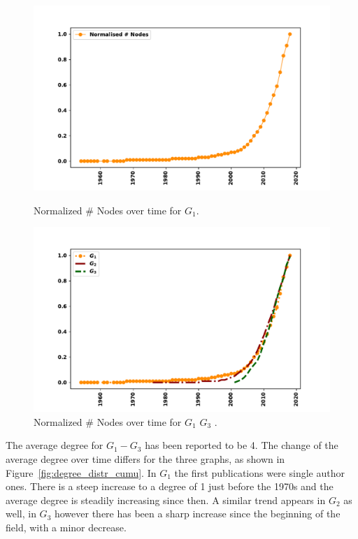 \documentclass{article}
\theoremstyle{definition}
\begin{document}
\begin{figure}[!hbtp]
    \begin{minipage}{.45\textwidth}
        \centering
        \includegraphics[width=\textwidth]{./assets/images/nodes_percentage_over_time.pdf}
        \caption{Normalized \# Nodes over time for \(G_1\).}\label{fig:nodes_cumu_pd}
    \end{minipage}%
    \begin{minipage}{.45\textwidth}
        \centering
        \includegraphics[width=\textwidth]{./assets/images/percentage_networks_nodes.pdf}
        \caption{Normalized \# Nodes over time for \(G_1\) \-\(G_3\) .}\label{fig:nodes_cumu}
    \end{minipage}
\end{figure}

The average degree for \(G_1 - G_3\) has been reported to be 4. The change of the
average degree over time differs for the three graphs, as shown in Figure~\ref{fig:degree_distr_cumu}.
In \(G_1\) the first publications were single author ones. There is a steep increase
to a degree of 1 just before the 1970s and the average degree is steadily increasing
since then. A similar trend appears in \(G_2\) as well, in \(G_3\) however
there has been a sharp increase since the beginning of the field, with
a minor decrease.
\end{document}
